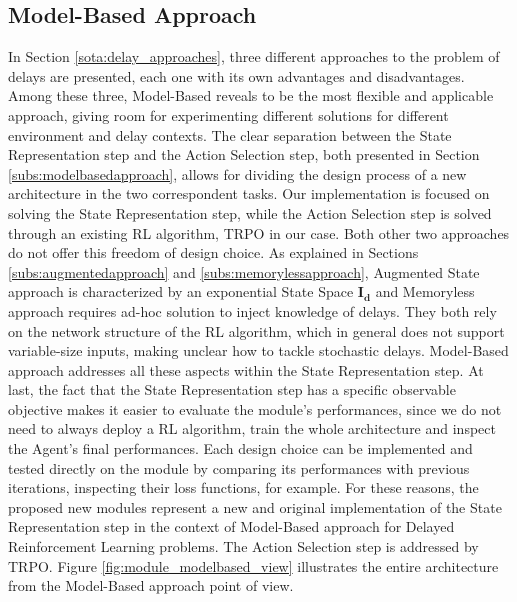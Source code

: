         \subsection{Model-Based Approach}
            In Section \ref{sota:delay_approaches}, three different approaches to the problem of delays are presented, each one with its own advantages and disadvantages. Among these three, Model-Based reveals to be the most flexible and applicable approach, giving room for experimenting different solutions for different environment and delay contexts. \newline
            The clear separation between the State Representation step and the Action Selection step, both presented in Section \ref{subs:modelbasedapproach}, allows for dividing the design process of a new architecture in the two correspondent tasks. Our implementation is focused on solving the State Representation step, while the Action Selection step is solved through an existing RL algorithm, TRPO in our case. Both other two approaches do not offer this freedom of design choice. \newline
            As explained in Sections \ref{subs:augmentedapproach} and \ref{subs:memorylessapproach}, Augmented State approach is characterized by an exponential State Space $\mathbf{I_d}$ and Memoryless approach requires ad-hoc solution to inject knowledge of delays. They both rely on the network structure of the RL algorithm, which in general does not support variable-size inputs, making unclear how to tackle stochastic delays. Model-Based approach addresses all these aspects within the State Representation step. \newline
            At last, the fact that the State Representation step has a specific observable objective makes it easier to evaluate the module's performances, since we do not need to always deploy a RL algorithm, train the whole architecture and inspect the Agent's final performances. Each design choice can be implemented and tested directly on the module by comparing its performances with previous iterations, inspecting their loss functions, for example. \newline
            For these reasons, the proposed new modules represent a new and original implementation of the State Representation step in the context of Model-Based approach for Delayed Reinforcement Learning problems. The Action Selection step is addressed by TRPO. Figure \ref{fig:module_modelbased_view} illustrates the entire architecture from the Model-Based approach point of view.
